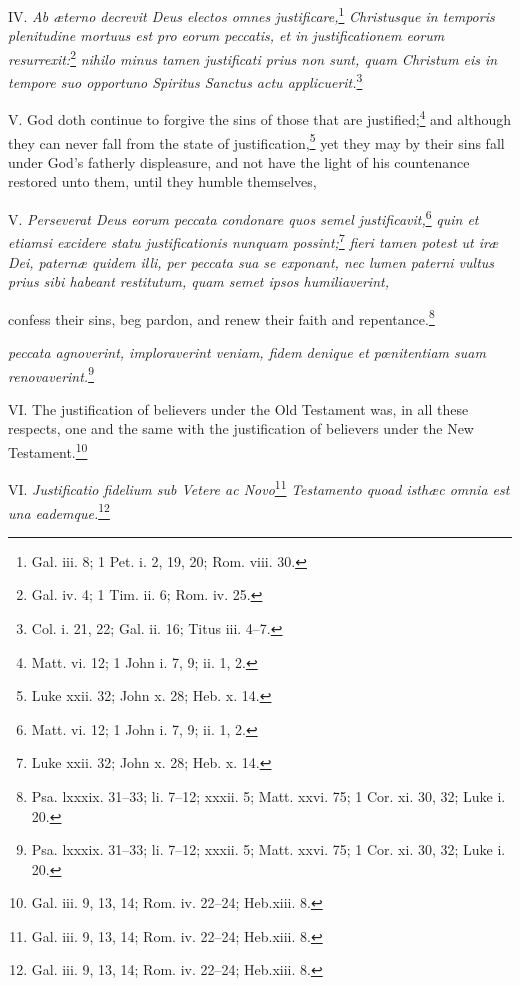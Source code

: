 IV. \emph{Ab æterno decrevit Deus electos omnes justificare,}\footnote{Gal. iii. 8; 1 Pet. i. 2, 19, 20; Rom. viii. 30.}\emph{ Christusque in temporis plenitudine mortuus est pro eorum peccatis, et in justificationem eorum resurrexit:}\footnote{Gal. iv. 4; 1 Tim. ii. 6; Rom. iv. 25.}\emph{ nihilo minus tamen justificati prius non sunt, quam Christum eis in tempore suo opportuno Spiritus Sanctus actu applicuerit.}\footnote{Col. i. 21, 22; Gal. ii. 16; Titus iii. 4–7.}

V. God doth continue to forgive the sins of those that are justified;\footnote{Matt. vi. 12; 1 John i. 7, 9; ii. 1, 2.} and although they can never fall from the state of justification,\footnote{Luke xxii. 32; John x. 28; Heb. x. 14.} yet they may by their sins fall under God's fatherly displeasure, and not have the light of his countenance restored unto them, until they humble themselves,

V. \emph{Perseverat Deus eorum peccata condonare quos semel justificavit,}\footnote{Matt. vi. 12; 1 John i. 7, 9; ii. 1, 2.}\emph{ quin et etiamsi excidere statu justificationis nunquam possint;}\footnote{Luke xxii. 32; John x. 28; Heb. x. 14.}\emph{ fieri tamen potest ut iræ Dei, paternæ quidem illi, per peccata sua se exponant, nec lumen paterni vultus prius sibi habeant restitutum, quam semet ipsos humiliaverint, }

confess their sins, beg pardon, and renew their faith and repentance.\footnote{Psa. lxxxix. 31–33; li. 7–12; xxxii. 5; Matt. xxvi. 75; 1 Cor. xi. 30, 32; Luke i. 20.}

\emph{peccata agnoverint, imploraverint veniam, fidem denique et pœnitentiam suam renovaverint.}\footnote{Psa. lxxxix. 31–33; li. 7–12; xxxii. 5; Matt. xxvi. 75; 1 Cor. xi. 30, 32; Luke i. 20.}

VI. The justification of believers under the Old Testament was, in all these respects, one and the same with the justification of believers under the New Testament.\footnote{Gal. iii. 9, 13, 14; Rom. iv. 22–24; Heb.xiii. 8.}

VI. \emph{Justificatio fidelium sub Vetere ac Novo}\footnote{Gal. iii. 9, 13, 14; Rom. iv. 22–24; Heb.xiii. 8.}\emph{ Testamento quoad isthæc omnia est una eademque.}\footnote{Gal. iii. 9, 13, 14; Rom. iv. 22–24; Heb.xiii. 8.}


